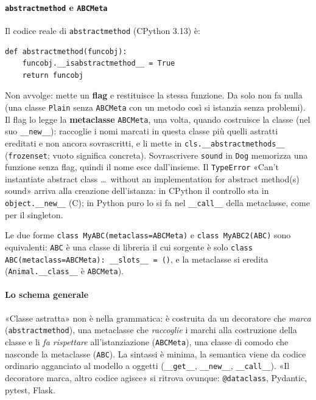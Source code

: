 \documentclass[a4paper,12pt]{article}
\begin{document}
\paragraph{\texttt{abstractmethod} e \texttt{ABCMeta}} Il codice reale di \texttt{abstractmethod}
(CPython 3.13) è:
\begin{verbatim}
def abstractmethod(funcobj):
    funcobj.__isabstractmethod__ = True
    return funcobj
\end{verbatim}
Non avvolge: mette un \textbf{flag} e restituisce la stessa funzione. Da solo non fa nulla (una
classe \texttt{Plain} senza \texttt{ABCMeta} con un metodo così si istanzia senza problemi).
Il flag lo legge la \textbf{metaclasse} \texttt{ABCMeta}, una volta, quando costruisce la classe
(nel suo \texttt{\_\_new\_\_}): raccoglie i nomi marcati in questa classe più quelli astratti
ereditati e non ancora sovrascritti, e li mette in \texttt{cls.\_\_abstractmethods\_\_}
(\texttt{frozenset}; vuoto significa concreta). Sovrascrivere \texttt{sound} in \texttt{Dog}
memorizza una funzione senza flag, quindi il nome esce dall'insieme. Il \texttt{TypeError} «Can't
instantiate abstract class \dots\ without an implementation for abstract method(s) sound»
arriva alla creazione dell'istanza: in CPython il controllo sta in \texttt{object.\_\_new\_\_}
(C); in Python puro lo si fa nel \texttt{\_\_call\_\_} della metaclasse, come per il singleton.

Le due forme \texttt{class MyABC(metaclass=ABCMeta)} e \texttt{class MyABC2(ABC)} sono
equivalenti: \texttt{ABC} è una classe di libreria il cui sorgente è solo
\texttt{class ABC(metaclass=ABCMeta): \_\_slots\_\_ = ()}, e la metaclasse si eredita
(\texttt{Animal.\_\_class\_\_} è \texttt{ABCMeta}).

\paragraph{Lo schema generale} «Classe astratta» non è nella grammatica: è costruita da un
decoratore che \emph{marca} (\texttt{abstractmethod}), una metaclasse che \emph{raccoglie} i marchi
alla costruzione della classe e li \emph{fa rispettare} all'istanziazione (\texttt{ABCMeta}), una
classe di comodo che nasconde la metaclasse (\texttt{ABC}). La sintassi è minima, la semantica
viene da codice ordinario agganciato al modello a oggetti (\texttt{\_\_get\_\_},
\texttt{\_\_new\_\_}, \texttt{\_\_call\_\_}). «Il decoratore marca, altro codice agisce» si
ritrova ovunque: \texttt{@dataclass}, Pydantic, pytest, Flask.
\end{document}
